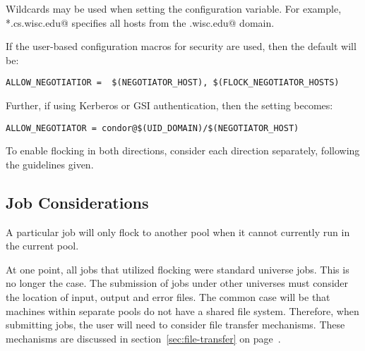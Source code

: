 Wildcards may be used when setting the 
configuration variable.
For example, \verb@*.cs.wisc.edu@ specifies all hosts
from the \verb@cs.wisc.edu@ domain. 

If the user-based configuration macros for security are used,
then the default will be:
\footnotesize
\begin{verbatim}
ALLOW_NEGOTIATIOR =  $(NEGOTIATOR_HOST), $(FLOCK_NEGOTIATOR_HOSTS)
\end{verbatim}
\normalsize

Further, if using Kerberos or GSI authentication, then the setting
becomes:
\footnotesize
\begin{verbatim}
ALLOW_NEGOTIATOR = condor@$(UID_DOMAIN)/$(NEGOTIATOR_HOST)
\end{verbatim}
\normalsize

To enable flocking in both directions, consider each direction
separately, following the guidelines given.

\subsection{\label{sec:Jobs-Flocking}Job Considerations}

A particular job will only flock to another pool
when it cannot currently run in the current pool.

At one point, all jobs that utilized flocking were standard
universe jobs.
This is no longer the case.
The submission of jobs under other universes must consider
the location of input, output and error files.
The common case will be that machines within separate pools
do not have a shared file system.
Therefore, when submitting jobs, the user will need to consider
file transfer mechanisms.
These mechanisms are discussed in
section~\ref{sec:file-transfer} on page~\pageref{sec:file-transfer}.
